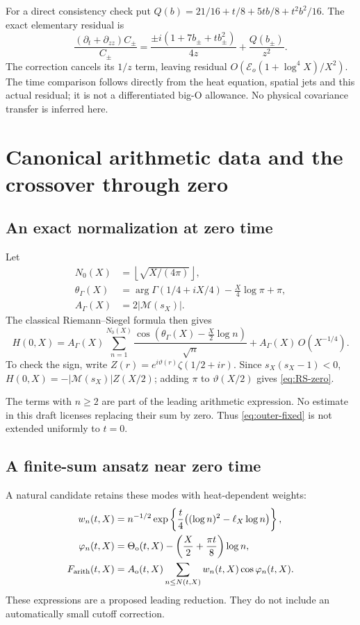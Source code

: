 \documentclass[11pt]{article}
\newcommand{\Mc}{\mathcal M}
\numberwithin{equation}{section}
\begin{document}
For a direct consistency check put
\(Q(b)=21/16+t/8+5tb/8+t^2b^2/16\). The exact elementary residual is
\begin{equation}
 \frac{(\partial_t+\partial_{zz})C_\pm}{C_\pm}
 =\frac{\pm i(1+7b_\pm+tb_\pm^2)}{4z}+\frac{Q(b_\pm)}{z^2}.
 \label{eq:elementary-residual}
\end{equation}
The correction cancels its \(1/z\) term, leaving residual
\(O(\mathcal E_o(1+\log^4X)/X^2)\). The time comparison follows
directly from the heat equation, spatial jets and this actual residual;
it is not a differentiated big-O allowance. No physical covariance
transfer is inferred here.


\section{Canonical arithmetic data and the crossover through zero}
\label{sec:arithmetic}
\subsection{An exact normalization at zero time}
Let
\begin{align}
N_0(X)&=\left\lfloor\sqrt{X/(4\pi)}\right\rfloor,\\
\theta_\Gamma(X)&=\arg\Gamma(1/4+iX/4)-\frac X4\log\pi+\pi,\\
A_\Gamma(X)&=2|\Mc(s_X)|.
\end{align}
The classical Riemann--Siegel formula \cite[25.10.1--25.10.3]{dlmf-rs}
then gives
\begin{equation}
H(0,X)=A_\Gamma(X)
 \sum_{n=1}^{N_0(X)}\frac{\cos(\theta_\Gamma(X)-\tfrac X2\log n)}{\sqrt n}
 +A_\Gamma(X)\,O(X^{-1/4}).
\label{eq:RS-zero}
\end{equation}
To check the sign, write \(Z(r)=e^{i\vartheta(r)}\zeta(1/2+ir)\).
Since \(s_X(s_X-1)<0\), \(H(0,X)=-|\Mc(s_X)|Z(X/2)\);
adding \(\pi\) to \(\vartheta(X/2)\) gives \eqref{eq:RS-zero}.

The terms with \(n\ge2\) are part of the leading arithmetic expression.
No estimate in this draft licenses replacing their sum by zero.
Thus \eqref{eq:outer-fixed} is not extended uniformly to \(t=0\).

\subsection{A finite-sum ansatz near zero time}
A natural candidate retains these modes with heat-dependent weights:
\begin{align}
w_n(t,X)&=n^{-1/2}
 \exp\left\{\frac t4\big((\log n)^2-\ell_X\log n\big)\right\},
\label{eq:weights}\\
\varphi_n(t,X)&=\Theta_{\mathrm o}(t,X)
                   -\left(\frac X2+\frac{\pi t}{8}\right)\log n,\\
F_{\rm arith}(t,X)&=
 A_{\mathrm o}(t,X)\sum_{n\le N(t,X)}
                              w_n(t,X)\cos\varphi_n(t,X).
\label{eq:arithmetic-candidate}
\end{align}
These expressions are a proposed leading reduction. They do not include
an automatically small cutoff correction.
\end{document}
